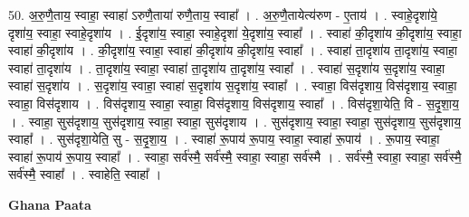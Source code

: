 \documentclass[17pt]{extarticle}
\begin{document}
50. अ॒रु॒णै॒ताय॒ स्वाहा॒ स्वाहा॑ ऽरुणै॒ताया॑ रुणै॒ताय॒ स्वाहा᳚ । . अ॒रु॒णै॒तायेत्य॑रुण - ए॒ताय॑ । . स्वाहे॒दृशा॑ये॒ दृशा॑य॒ स्वाहा॒ स्वाहे॒दृशा॑य । . ई॒दृशा॑य॒ स्वाहा॒ स्वाहे॒दृशा॑ ये॒दृशा॑य॒ स्वाहा᳚ । . स्वाहा॑ की॒दृशा॑य की॒दृशा॑य॒ स्वाहा॒ स्वाहा॑ की॒दृशा॑य । . की॒दृशा॑य॒ स्वाहा॒ स्वाहा॑ की॒दृशा॑य की॒दृशा॑य॒ स्वाहा᳚ । . स्वाहा॑ ता॒दृशा॑य ता॒दृशा॑य॒ स्वाहा॒ स्वाहा॑ ता॒दृशा॑य । . ता॒दृशा॑य॒ स्वाहा॒ स्वाहा॑ ता॒दृशा॑य ता॒दृशा॑य॒ स्वाहा᳚ । . स्वाहा॑ स॒दृशा॑य स॒दृशा॑य॒ स्वाहा॒ स्वाहा॑ स॒दृशा॑य । . स॒दृशा॑य॒ स्वाहा॒ स्वाहा॑ स॒दृशा॑य स॒दृशा॑य॒ स्वाहा᳚ । . स्वाहा॒ विस॑दृशाय॒ विस॑दृशाय॒ स्वाहा॒ स्वाहा॒ विस॑दृशाय । . विस॑दृशाय॒ स्वाहा॒ स्वाहा॒ विस॑दृशाय॒ विस॑दृशाय॒ स्वाहा᳚ । . विस॑दृशा॒येति॒ वि - स॒दृ॒शा॒य॒ । . स्वाहा॒ सुस॑दृशाय॒ सुस॑दृशाय॒ स्वाहा॒ स्वाहा॒ सुस॑दृशाय । . सुस॑दृशाय॒ स्वाहा॒ स्वाहा॒ सुस॑दृशाय॒ सुस॑दृशाय॒ स्वाहा᳚ । . सुस॑दृशा॒येति॒ सु - स॒दृ॒शा॒य॒ । . स्वाहा॑ रू॒पाय॑ रू॒पाय॒ स्वाहा॒ स्वाहा॑ रू॒पाय॑ । . रू॒पाय॒ स्वाहा॒ स्वाहा॑ रू॒पाय॑ रू॒पाय॒ स्वाहा᳚ । . स्वाहा॒ सर्व॑स्मै॒ सर्व॑स्मै॒ स्वाहा॒ स्वाहा॒ सर्व॑स्मै । . सर्व॑स्मै॒ स्वाहा॒ स्वाहा॒ सर्व॑स्मै॒ सर्व॑स्मै॒ स्वाहा᳚ । . स्वाहेति॒ स्वाहा᳚ । \newline

\textbf{Ghana Paata } \newline
\end{document}

